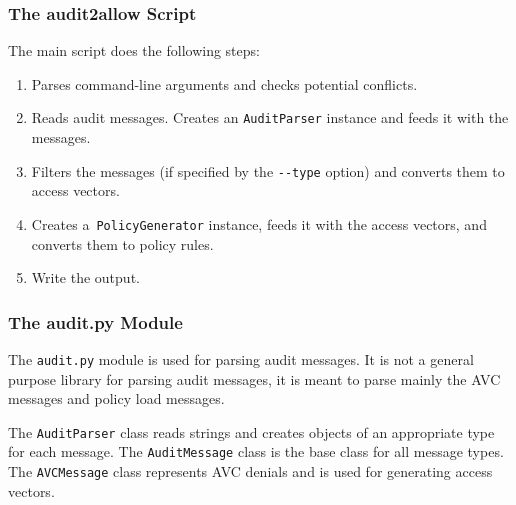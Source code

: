 \subsubsection{The audit2allow Script}

The main script does the following steps:
\begin{enumerate}
    \item Parses command-line arguments and checks potential conflicts.
    \item Reads audit messages. Creates an \texttt{AuditParser} instance and
        feeds it with the messages.
    \item Filters the messages (if specified by the \texttt{-{}-type} option)
        and converts them to access vectors.
    \item Creates a~\texttt{PolicyGenerator} instance, feeds it with the access
        vectors, and converts them to policy rules.
    \item Write the output.
\end{enumerate}

\subsubsection{The audit.py Module}

The \texttt{audit.py} module is used for parsing audit messages. It is not a
general purpose library for parsing audit messages, it is meant to parse mainly
the AVC messages and policy load messages.

The \texttt{AuditParser} class reads strings and creates objects of an
appropriate type for each message. The \texttt{AuditMessage} class is the base
class for all message types. The \texttt{AVCMessage} class represents AVC
denials and is used for generating access vectors.

